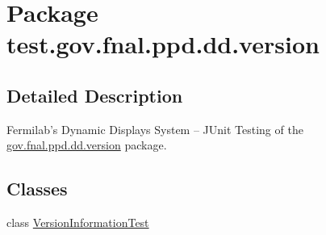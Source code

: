 \hypertarget{namespacetest_1_1gov_1_1fnal_1_1ppd_1_1dd_1_1version}{\section{Package test.\-gov.\-fnal.\-ppd.\-dd.\-version}
\label{namespacetest_1_1gov_1_1fnal_1_1ppd_1_1dd_1_1version}
}


\subsection{Detailed Description}
Fermilab's Dynamic Displays System -- J\-Unit Testing of the \hyperlink{namespacetest_1_1gov_1_1fnal_1_1ppd_1_1dd_1_1version}{gov.\-fnal.\-ppd.\-dd.\-version} package.\subsection*{Classes}
\begin{DoxyCompactItemize}
\item 
class \hyperlink{classtest_1_1gov_1_1fnal_1_1ppd_1_1dd_1_1version_1_1VersionInformationTest}{Version\-Information\-Test}
\end{DoxyCompactItemize}
